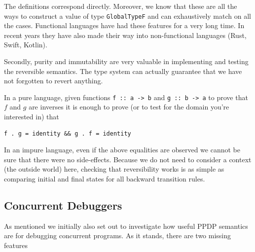 \documentclass[runningheads,plain]{llncs}
\begin{document}
The definitions correspond directly. Moreover, we know that these are
all the ways to construct a value of type \texttt{GlobalTypeF} and can
exhaustively match on all the cases. Functional languages have had these
features for a very long time. In recent years they have also made their
way into non-functional languages (Rust, Swift, Kotlin).

Secondly, purity and immutability are very valuable in implementing and
testing the reversible semantics. The type system can actually guarantee
that we have not forgotten to revert anything.

In a pure language, given functions
\texttt{f\ ::\ a\ -\textgreater{}\ b} and
\texttt{g\ ::\ b\ -\textgreater{}\ a} to prove that \(f\) and \(g\) are
inverses it is enough to prove (or to test for the domain you're
interested in) that

\begin{verbatim}
f . g = identity && g . f = identity
\end{verbatim}

In an impure language, even if the above equalities are observed we
cannot be sure that there were no side-effects. Because we do not need
to consider a context (the outside world) here, checking that
reversibility works is as simple as comparing initial and final states
for all backward transition rules.

\subsection{Concurrent Debuggers}\label{concurrent-debuggers}

As mentioned we initially also set out to investigate how useful PPDP
semantics are for debugging concurrent programs. As it stands, there are
two missing features
\end{document}
